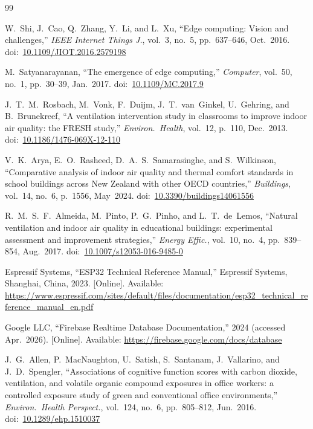 \documentclass[12pt, a4paper]{article}
\begin{document}
\begin{thebibliography}{99}

W.~Shi, J.~Cao, Q.~Zhang, Y.~Li, and L.~Xu,
``Edge computing: Vision and challenges,''
\textit{IEEE Internet Things J.}, vol.~3, no.~5,
pp.~637--646, Oct.~2016.
doi:~\href{https://doi.org/10.1109/JIOT.2016.2579198}
{10.1109/JIOT.2016.2579198}

M.~Satyanarayanan,
``The emergence of edge computing,''
\textit{Computer}, vol.~50, no.~1,
pp.~30--39, Jan.~2017.
doi:~\href{https://doi.org/10.1109/MC.2017.9}{10.1109/MC.2017.9}

J.~T.~M.~Rosbach, M.~Vonk, F.~Duijm, J.~T.~van~Ginkel,
U.~Gehring, and B.~Brunekreef,
``A ventilation intervention study in classrooms to improve indoor
air quality: the FRESH study,''
\textit{Environ.\ Health}, vol.~12, p.~110, Dec.~2013.
doi:~\href{https://doi.org/10.1186/1476-069X-12-110}
{10.1186/1476-069X-12-110}

V.~K.~Arya, E.~O.~Rasheed, D.~A.~S.~Samarasinghe, and S.~Wilkinson,
``Comparative analysis of indoor air quality and thermal comfort
standards in school buildings across New Zealand with other OECD
countries,''
\textit{Buildings}, vol.~14, no.~6, p.~1556, May~2024.
doi:~\href{https://doi.org/10.3390/buildings14061556}
{10.3390/buildings14061556}

R.~M.~S.~F.~Almeida, M.~Pinto, P.~G.~Pinho, and L.~T.~de~Lemos,
``Natural ventilation and indoor air quality in educational buildings:
experimental assessment and improvement strategies,''
\textit{Energy Effic.}, vol.~10, no.~4,
pp.~839--854, Aug.~2017.
doi:~\href{https://doi.org/10.1007/s12053-016-9485-0}
{10.1007/s12053-016-9485-0}

Espressif Systems,
``{ESP32 Technical Reference Manual},''
Espressif Systems, Shanghai, China, 2023.
[Online]. Available:
\url{https://www.espressif.com/sites/default/files/documentation/esp32_technical_reference_manual_en.pdf}

Google LLC,
``{Firebase Realtime Database Documentation},''
2024 (accessed Apr.~2026).
[Online]. Available: \url{https://firebase.google.com/docs/database}

J.~G.~Allen, P.~MacNaughton, U.~Satish, S.~Santanam,
J.~Vallarino, and J.~D.~Spengler,
``Associations of cognitive function scores with carbon dioxide,
ventilation, and volatile organic compound exposures in office workers:
a controlled exposure study of green and conventional office
environments,''
\textit{Environ.\ Health Perspect.}, vol.~124, no.~6,
pp.~805--812, Jun.~2016.
doi:~\href{https://doi.org/10.1289/ehp.1510037}{10.1289/ehp.1510037}


\end{thebibliography}
\end{document}
